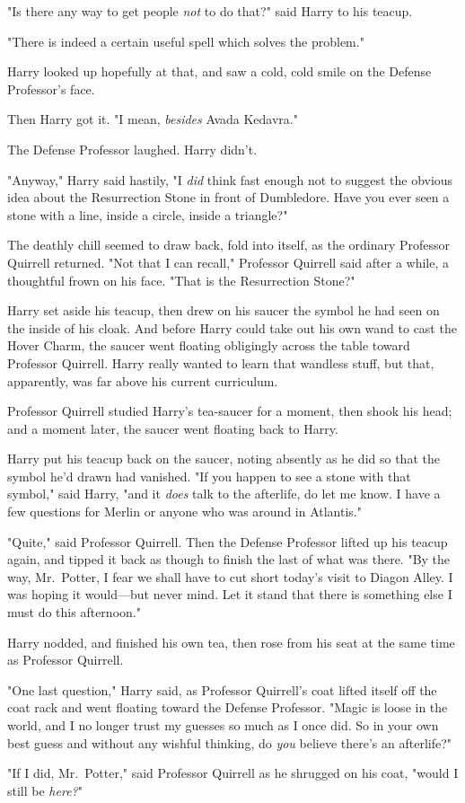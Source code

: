 "Is there any way to get people \emph{not} to do that?" said Harry to his
teacup.

"There is indeed a certain useful spell which solves the problem."

Harry looked up hopefully at that, and saw a cold, cold smile on the Defense
Professor's face.

Then Harry got it. "I mean, \emph{besides} Avada Kedavra."

The Defense Professor laughed. Harry didn't.

"Anyway," Harry said hastily, "I \emph{did} think fast enough not to suggest
the obvious idea about the Resurrection Stone in front of Dumbledore. Have you
ever seen a stone with a line, inside a circle, inside a triangle?"

The deathly chill seemed to draw back, fold into itself, as the ordinary
Professor Quirrell returned. "Not that I can recall," Professor Quirrell said
after a while, a thoughtful frown on his face. "That is the Resurrection Stone?"

Harry set aside his teacup, then drew on his saucer the symbol he had seen on
the inside of his cloak. And before Harry could take out his own wand to cast
the Hover Charm, the saucer went floating obligingly across the table toward
Professor Quirrell. Harry really wanted to learn that wandless stuff, but that,
apparently, was far above his current curriculum.

Professor Quirrell studied Harry's tea-saucer for a moment, then shook his
head; and a moment later, the saucer went floating back to Harry.

Harry put his teacup back on the saucer, noting absently as he did so that the
symbol he'd drawn had vanished. "If you happen to see a stone with that
symbol," said Harry, "and it \emph{does} talk to the afterlife, do let me know.
I have a few questions for Merlin or anyone who was around in Atlantis."

"Quite," said Professor Quirrell. Then the Defense Professor lifted up his
teacup again, and tipped it back as though to finish the last of what was
there. "By the way, Mr.~Potter, I fear we shall have to cut short today's visit
to Diagon Alley. I was hoping it would---but never mind. Let it stand that
there is something else I must do this afternoon."

Harry nodded, and finished his own tea, then rose from his seat at the same
time as Professor Quirrell.

"One last question," Harry said, as Professor Quirrell's coat lifted itself off
the coat rack and went floating toward the Defense Professor. "Magic is loose in
the world, and I no longer trust my guesses so much as I once did. So in your
own best guess and without any wishful thinking, do \emph{you} believe there's
an afterlife?"

"If I did, Mr.~Potter," said Professor Quirrell as he shrugged on his coat,
"would I still be \emph{here?}"
